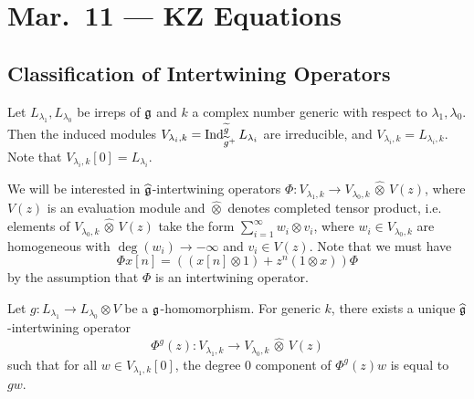 \chapter{Mar.~11 --- KZ Equations}

\section{Classification of Intertwining Operators}

\begin{remark}
  Let $L_{\lambda_1}, L_{\lambda_0}$ be irreps
  of $\mathfrak{g}$ and $k$ a complex number generic
  with respect to $\lambda_1, \lambda_0$.
  Then the induced modules
  $V_{\lambda_i, k} = \operatorname{Ind}_{\widetilde{g}^+}^{\widetilde{g}} L_{\lambda_i}$
  are irreducible, and
  $V_{\lambda_i, k} = L_{\lambda_i, k}$.
  Note that $V_{\lambda_i, k}[0] = L_{\lambda_i}$.

  We will be interested in $\widehat{\mathfrak{g}}$-intertwining
  operators
  $\Phi : V_{\lambda_1, k} \to V_{\lambda_0, k}\, {\widehat{\otimes}}\, V(z)$,
  where $V(z)$ is an evaluation module and
  $\widehat{\otimes}$ denotes completed tensor product,
  i.e. elements of $V_{\lambda_0, k} \, \widehat{\otimes}\, V(z)$
  take the form
  $\sum_{i = 1}^\infty w_i \otimes v_i$, where
  $w_i \in V_{\lambda_0, k}$ are homogeneous
  with $\deg(w_i) \to -\infty$ and $v_i \in V(z)$.
  Note that we must have
  \[
    \Phi x[n] = ((x[n] \otimes 1) + z^n(1 \otimes x)) \Phi
  \]
  by the assumption that $\Phi$ is an intertwining
  operator.
\end{remark}

\begin{theorem}
  Let $g : L_{\lambda_1} \to L_{\lambda_0} \otimes V$
  be a $\mathfrak{g}$-homomorphism. For generic $k$, there exists
  a unique $\widehat{\mathfrak{g}}$-intertwining operator
  \[\Phi^g(z) : V_{\lambda_1, k} \longrightarrow V_{\lambda_0, k} \, \widehat{\otimes} \, V(z)\]
  such that for all $w \in V_{\lambda_1, k}[0]$,
  the degree $0$ component of $\Phi^g(z) w$ is
  equal to $gw$.
\end{theorem}

